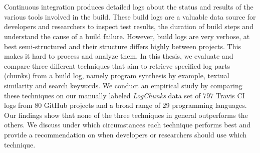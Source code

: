 \documentclass[\myrootdir/main.tex]{subfiles}
\begin{document}
\chapter*{\myAbstractTitle}

Continuous integration produces detailed logs about the status and results of the various tools involved in the build.
These build logs are a valuable data source for developers and researchers to inspect test results, the duration of build steps and understand the cause of a build failure.
However, build logs are very verbose, at best semi-structured and their structure differs highly between projects.
This makes it hard to process and analyze them.
In this thesis, we evaluate and compare three different techniques that aim to retrieve specified log parts (chunks) from a build log, namely program synthesis by example, textual similarity and search keywords.
We conduct an empirical study by comparing these techniques on our manually labeled \emph{LogChunks} data set of 797 Travis CI logs from 80 GitHub projects and a broad range of 29 programming languages.
Our findings show that none of the three techniques in general outperforms the others.
We discuss under which circumstances each technique performs best and provide a recommendation on when developers or researchers should use which technique.
\end{document}
